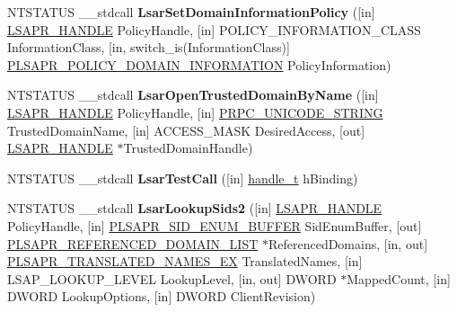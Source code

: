 \begin{DoxyCompactItemize}
\item 
\mbox{\label{interfacelsarpc_abff1e8a752667f57eca92f974b289051}} 
N\+T\+S\+T\+A\+T\+US \+\_\+\+\_\+stdcall {\bfseries Lsar\+Set\+Domain\+Information\+Policy} (\mbox{[}in\mbox{]} \hyperlink{interfacevoid}{L\+S\+A\+P\+R\+\_\+\+H\+A\+N\+D\+LE} Policy\+Handle, \mbox{[}in\mbox{]} P\+O\+L\+I\+C\+Y\+\_\+\+I\+N\+F\+O\+R\+M\+A\+T\+I\+O\+N\+\_\+\+C\+L\+A\+SS Information\+Class, \mbox{[}in, switch\+\_\+is(Information\+Class)\mbox{]} \hyperlink{union___l_s_a_p_r___p_o_l_i_c_y___d_o_m_a_i_n___i_n_f_o_r_m_a_t_i_o_n}{P\+L\+S\+A\+P\+R\+\_\+\+P\+O\+L\+I\+C\+Y\+\_\+\+D\+O\+M\+A\+I\+N\+\_\+\+I\+N\+F\+O\+R\+M\+A\+T\+I\+ON} Policy\+Information)
\item 
\mbox{\label{interfacelsarpc_a5da960160509bfe2e2c795c895f607c5}} 
N\+T\+S\+T\+A\+T\+US \+\_\+\+\_\+stdcall {\bfseries Lsar\+Open\+Trusted\+Domain\+By\+Name} (\mbox{[}in\mbox{]} \hyperlink{interfacevoid}{L\+S\+A\+P\+R\+\_\+\+H\+A\+N\+D\+LE} Policy\+Handle, \mbox{[}in\mbox{]} \hyperlink{struct___r_p_c___u_n_i_c_o_d_e___s_t_r_i_n_g}{P\+R\+P\+C\+\_\+\+U\+N\+I\+C\+O\+D\+E\+\_\+\+S\+T\+R\+I\+NG} Trusted\+Domain\+Name, \mbox{[}in\mbox{]} A\+C\+C\+E\+S\+S\+\_\+\+M\+A\+SK Desired\+Access, \mbox{[}out\mbox{]} \hyperlink{interfacevoid}{L\+S\+A\+P\+R\+\_\+\+H\+A\+N\+D\+LE} $\ast$Trusted\+Domain\+Handle)
\item 
\mbox{\label{interfacelsarpc_ad3bf1a234363b7384a583651efcae3ea}} 
N\+T\+S\+T\+A\+T\+US \+\_\+\+\_\+stdcall {\bfseries Lsar\+Test\+Call} (\mbox{[}in\mbox{]} \hyperlink{interfacevoid}{handle\+\_\+t} h\+Binding)
\item 
\mbox{\label{interfacelsarpc_ae26487a23f31d1e9379e982302846af9}} 
N\+T\+S\+T\+A\+T\+US \+\_\+\+\_\+stdcall {\bfseries Lsar\+Lookup\+Sids2} (\mbox{[}in\mbox{]} \hyperlink{interfacevoid}{L\+S\+A\+P\+R\+\_\+\+H\+A\+N\+D\+LE} Policy\+Handle, \mbox{[}in\mbox{]} \hyperlink{struct___l_s_a_p_r___s_i_d___e_n_u_m___b_u_f_f_e_r}{P\+L\+S\+A\+P\+R\+\_\+\+S\+I\+D\+\_\+\+E\+N\+U\+M\+\_\+\+B\+U\+F\+F\+ER} Sid\+Enum\+Buffer, \mbox{[}out\mbox{]} \hyperlink{struct___l_s_a_p_r___r_e_f_e_r_e_n_c_e_d___d_o_m_a_i_n___l_i_s_t}{P\+L\+S\+A\+P\+R\+\_\+\+R\+E\+F\+E\+R\+E\+N\+C\+E\+D\+\_\+\+D\+O\+M\+A\+I\+N\+\_\+\+L\+I\+ST} $\ast$Referenced\+Domains, \mbox{[}in, out\mbox{]} \hyperlink{struct___l_s_a_p_r___t_r_a_n_s_l_a_t_e_d___n_a_m_e_s___e_x}{P\+L\+S\+A\+P\+R\+\_\+\+T\+R\+A\+N\+S\+L\+A\+T\+E\+D\+\_\+\+N\+A\+M\+E\+S\+\_\+\+EX} Translated\+Names, \mbox{[}in\mbox{]} L\+S\+A\+P\+\_\+\+L\+O\+O\+K\+U\+P\+\_\+\+L\+E\+V\+EL Lookup\+Level, \mbox{[}in, out\mbox{]} D\+W\+O\+RD $\ast$Mapped\+Count, \mbox{[}in\mbox{]} D\+W\+O\+RD Lookup\+Options, \mbox{[}in\mbox{]} D\+W\+O\+RD Client\+Revision)

\end{DoxyCompactItemize}
